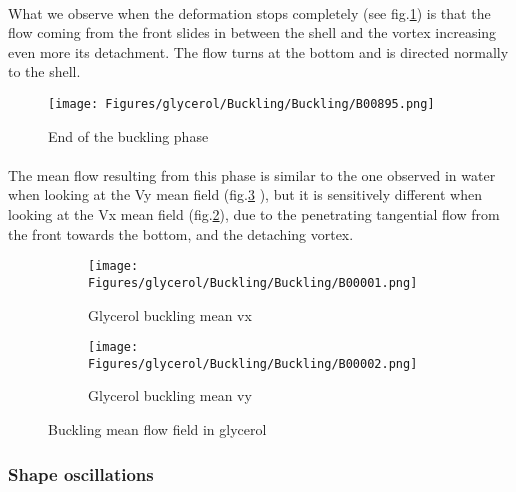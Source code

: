 \documentclass[a4paper,10pt]{report}
\begin{document}
\paragraph{}
What we observe when the deformation stops completely (see fig.\ref{fig:Beginningofthevortexdetachment}) is that the flow coming from the front slides in between the shell and the vortex increasing even more its detachment. The flow turns at the bottom and is directed normally to the shell.
\begin{figure}[htbp]%
	\centering%
		\texttt{[image: Figures/glycerol/Buckling/Buckling/B00895.png]}%
		\caption{End of the buckling phase}%
		\label{fig:Beginningofthevortexdetachment}%
\end{figure}
\paragraph{}
The mean flow resulting from this phase is similar to the one observed in water when looking at the Vy mean field (fig.\ref{fig:gbucklingmeanvy} ), but it is sensitively different when looking at the Vx mean field (fig.\ref{fig:gbucklingmeanvx}), due to the penetrating tangential flow from the front towards the bottom, and the detaching vortex.
\begin{figure}[htbp]%
	\centering%
	 \begin{subfigure}[h]{0.5\textwidth}%
        \texttt{[image: Figures/glycerol/Buckling/Buckling/B00001.png]}%
        \caption{Glycerol buckling mean vx}%
				\label{fig:gbucklingmeanvx}%
    \end{subfigure}%
    \begin{subfigure}[h]{0.5\linewidth}%
        \texttt{[image: Figures/glycerol/Buckling/Buckling/B00002.png]}%
        \caption{Glycerol buckling mean vy}%
        \label{fig:gbucklingmeanvy}%
    \end{subfigure}%
		\caption{Buckling mean flow field in glycerol}%
		\label{fig:Gbucklingmeanvelocityfield}%
\end{figure}
\subsubsection{Shape oscillations}
\end{document}

